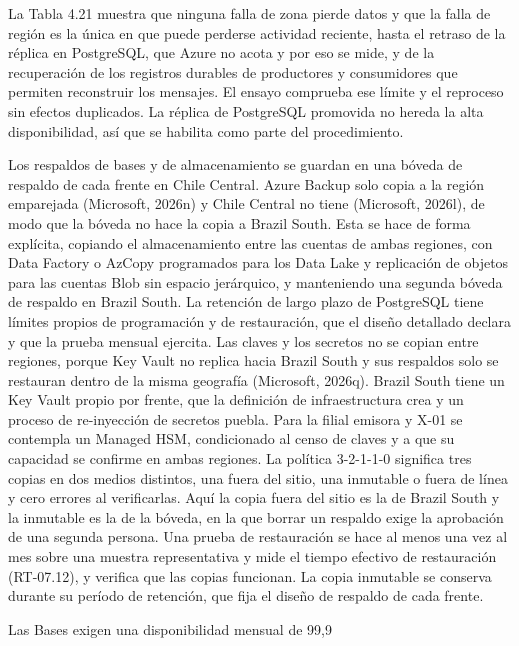 \documentclass[11pt]{article}
\begin{document}
La Tabla 4.21 muestra que ninguna falla de zona pierde datos y que la falla de región es la única en que puede perderse actividad reciente, hasta el retraso de la réplica en PostgreSQL, que Azure no acota y por eso se mide, y de la recuperación de los registros durables de productores y consumidores que permiten reconstruir los mensajes. El ensayo comprueba ese límite y el reproceso sin efectos duplicados. La réplica de PostgreSQL promovida no hereda la alta disponibilidad, así que se habilita como parte del procedimiento.

Los respaldos de bases y de almacenamiento se guardan en una bóveda de respaldo de cada frente en Chile Central. Azure Backup solo copia a la región emparejada (Microsoft, 2026n) y Chile Central no tiene (Microsoft, 2026l), de modo que la bóveda no hace la copia a Brazil South. Esta se hace de forma explícita, copiando el almacenamiento entre las cuentas de ambas regiones, con Data Factory o AzCopy programados para los Data Lake y replicación de objetos para las cuentas Blob sin espacio jerárquico, y manteniendo una segunda bóveda de respaldo en Brazil South. La retención de largo plazo de PostgreSQL tiene límites propios de programación y de restauración, que el diseño detallado declara y que la prueba mensual ejercita. Las claves y los secretos no se copian entre regiones, porque Key Vault no replica hacia Brazil South y sus respaldos solo se restauran dentro de la misma geografía (Microsoft, 2026q). Brazil South tiene un Key Vault propio por frente, que la definición de infraestructura crea y un proceso de re-inyección de secretos puebla. Para la filial emisora y X-01 se contempla un Managed HSM, condicionado al censo de claves y a que su capacidad se confirme en ambas regiones. La política 3-2-1-1-0 significa tres copias en dos medios distintos, una fuera del sitio, una inmutable o fuera de línea y cero errores al verificarlas. Aquí la copia fuera del sitio es la de Brazil South y la inmutable es la de la bóveda, en la que borrar un respaldo exige la aprobación de una segunda persona. Una prueba de restauración se hace al menos una vez al mes sobre una muestra representativa y mide el tiempo efectivo de restauración (RT-07.12), y verifica que las copias funcionan. La copia inmutable se conserva durante su período de retención, que fija el diseño de respaldo de cada frente.

Las Bases exigen una disponibilidad mensual de 99,9 %
\end{document}
